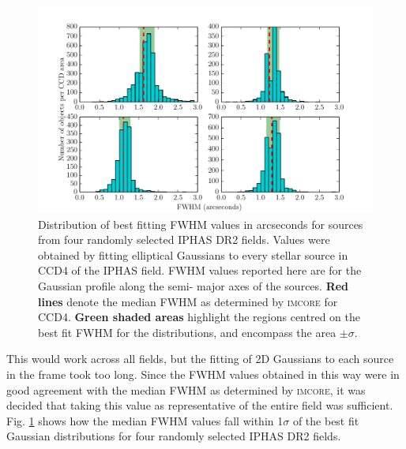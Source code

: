 \documentclass[a4paper,useAMS,usenatbib]{mn2e}
\begin{document}
\begin{figure} 
\begin{center}
\includegraphics[width=1.0\linewidth]{figures/parameter_fwhm.pdf}
\caption{\footnotesize Distribution of best fitting FWHM values in arcseconds for sources from four randomly selected IPHAS DR2 fields. Values were obtained by fitting elliptical Gaussians to every stellar source in CCD4 of the IPHAS
field. FWHM values reported here are for the Gaussian profile along the semi-
major axes of the sources. \textbf{Red lines} denote the median FWHM as
determined by \textsc{imcore} for CCD4. \textbf{Green shaded areas} highlight the regions centred on the best fit FWHM for the distributions, and encompass the area $\pm\sigma$.} 
\label{fig:parameter_fwhm} 
\end{center} 
\end{figure}

This would work across all fields, but the fitting of 2D Gaussians to each
source in the frame took too long. Since the FWHM values obtained in this way
were in good agreement with the median FWHM as determined by \textsc{imcore}, it was decided that taking this value as representative of the entire field was
sufficient. Fig. \ref{fig:parameter_fwhm} shows how the median FWHM values
fall within 1$\sigma$ of the best fit Gaussian distributions for four randomly
selected IPHAS DR2 fields.
\end{document}
